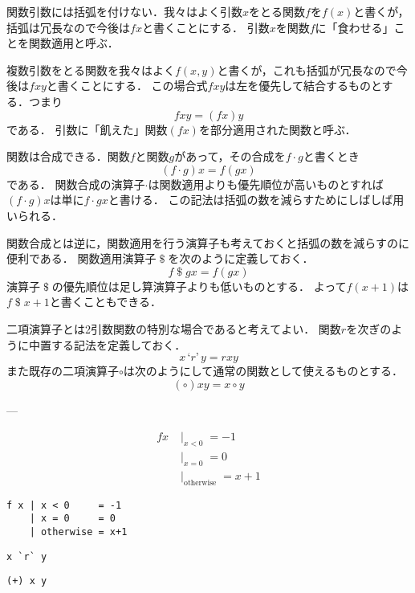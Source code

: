 \documentclass[twocolumn]{jsbook}
\newcommand{\dollar}{\mathop{\$}}
\begin{document}
関数引数には括弧を付けない．我々はよく引数$x$をとる関数$f$を$f(x)$と書くが，括弧は冗長なので今後は$fx$と書くことにする．
引数$x$を関数$f$に「食わせる」ことを関数適用と呼ぶ．

複数引数をとる関数を我々はよく$f(x,y)$と書くが，これも括弧が冗長なので今後は$fxy$と書くことにする．
この場合式$fxy$は左を優先して結合するものとする．つまり$$fxy=(fx)y$$である．
引数に「飢えた」関数$(fx)$を部分適用された関数と呼ぶ．

関数は合成できる．関数$f$と関数$g$があって，その合成を$f\cdot g$と書くとき$$(f\cdot g)x=f(gx)$$である．
関数合成の演算子$\cdot$は関数適用よりも優先順位が高いものとすれば$(f\cdot g)x$は単に$f\cdot gx$と書ける．
この記法は括弧の数を減らすためにしばしば用いられる．

関数合成とは逆に，関数適用を行う演算子も考えておくと括弧の数を減らすのに便利である．
関数適用演算子$\dollar$を次のように定義しておく．
\begin{equation}
f\dollar gx=f(gx)
\end{equation}
演算子$\dollar$の優先順位は足し算演算子よりも低いものとする．
よって$f(x+1)$は$f\dollar x+1$と書くこともできる．

二項演算子とは2引数関数の特別な場合であると考えてよい．
関数$r$を次ぎのように中置する記法を定義しておく．
\begin{equation}
x\,\text{`$r$'}\,y=rxy
\end{equation}
また既存の二項演算子$\circ$は次のようにして通常の関数として使えるものとする．
\begin{equation}
(\circ)xy=x\circ y
\end{equation}



---

\begin{equation}
\begin{split}
fx&\mid_{x<0}=-1\\
&\mid_{x=0}=0\\
&\mid_\text{otherwise}=x+1
\end{split}
\end{equation}

\begin{verbatim}
f x | x < 0     = -1
    | x = 0     = 0
    | otherwise = x+1
\end{verbatim}


\begin{verbatim}
x `r` y
\end{verbatim}

\begin{verbatim}
(+) x y
\end{verbatim}
\end{document}
